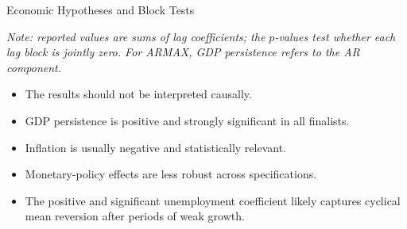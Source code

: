 \documentclass[aspectratio=169,10pt]{beamer}
\newcommand{\smallnote}[1]{%
  \par\vspace{0.05cm}%
  \noindent
  \begin{minipage}{0.96\linewidth}
    \raggedright\scriptsize\itshape #1
  \end{minipage}%
}
\begin{document}
\begin{frame}{Economic Hypotheses and Block Tests}
\centering
{}
\smallnote{Note: reported values are sums of lag coefficients; the $p$-values test whether each lag block is jointly zero. For ARMAX, GDP persistence refers to the AR component.}

\vspace{0.14cm}
\begin{itemize}
    \item The results should not be interpreted causally.
    \item GDP persistence is positive and strongly significant in all finalists.
    \item Inflation is usually negative and statistically relevant.
    \item Monetary-policy effects are less robust across specifications.
    \item The positive and significant unemployment coefficient likely captures cyclical mean reversion after periods of weak growth.
\end{itemize}

\end{frame}
\end{document}

